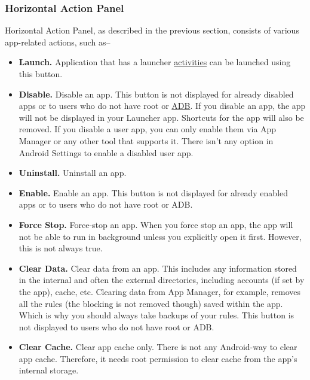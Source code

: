 \subsubsection{Horizontal Action Panel}\label{subsubsec:horizontal-action-panel} %
Horizontal Action Panel, as described in the previous section, consists of various app-related actions, such as--
\begin{itemize}
    \item \textbf{Launch.} Application that has a launcher \hyperref[subsubsec:activities]{activities} can be launched
    using this button.

    \item \textbf{Disable.} Disable an app. This button is not displayed for already disabled apps or to users who do
    not have root or \hyperref[sec:adb-over-tcp]{ADB}. If you disable an app, the app will not be displayed in your
    Launcher app. Shortcuts for the app will also be removed. If you disable a user app, you can only enable them via
    App Manager or any other tool that supports it. There isn't any option in Android Settings to enable a disabled user
    app.

    \item \textbf{Uninstall.} Uninstall an app.

    \item \textbf{Enable.} Enable an app. This button is not displayed for already enabled apps or to users who do not
    have root or ADB\@.

    \item \textbf{Force Stop.} Force-stop an app. When you force stop an app, the app will not be able to run in
    background unless you explicitly open it first. However, this is not always true.

    \item \textbf{Clear Data.} Clear data from an app. This includes any information stored in the internal and often
    the external directories, including accounts (if set by the app), cache, etc. Clearing data from App Manager, for
    example, removes all the rules (the blocking is not removed though) saved within the app. Which is why you should
    always take backups of your rules. This button is not displayed to users who do not have root or ADB\@.

    \item \textbf{Clear Cache.} Clear app cache only. There is not any Android-way to clear app cache. Therefore, it
    needs root permission to clear cache from the app's internal storage.


\end{itemize}
